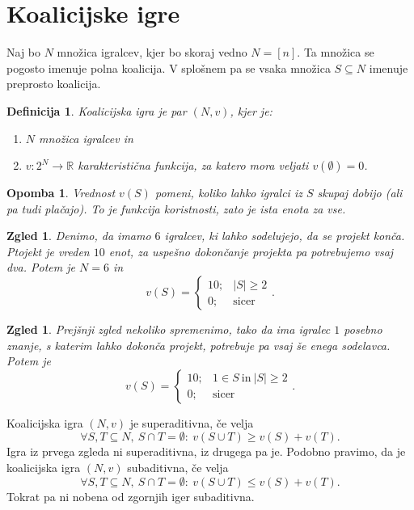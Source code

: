 \documentclass[10pt, a4paper]{article}
\newtheorem{defi}[izr]{Definicija}
\newenvironment{noticeB}{%
  \tcolorbox[%
  notitle,
  empty,
  enhanced,  %
  breakable,
  coltext=black,
  colback=white, 
  fontupper=\rmfamily,
  noparskip,
  sharp corners,
  boxrule=-1pt,  %
  frame hidden,
  left=7pt,  %
  right=7pt,
  top=5pt,
  bottom=5pt,
  before skip=2.5ex plus 2pt,
  after skip=2.5ex plus 2pt,
  borderline west = {1.5pt}{-0.1pt}{blue!30!black}, %
  overlay unbroken and last={%
    \draw[color=black, line width=1.25pt]
    ($(frame.south west)+(1.pt, -0.1pt)$) -- ++(2em, 0);
  }
  ]}
{\endtcolorbox}
\newenvironment{definicija}{\begin{noticeB}\begin{defi}}{%
    \end{defi}\end{noticeB}}
\newtheorem*{opomba}{Opomba}
\newtheorem{zgled}[izr]{Zgled}
\newcommand{\R}{\mathbb {R}}
\begin{document}
\section{Koalicijske igre}

Naj bo $N$ množica igralcev, kjer bo skoraj vedno $N = [n]$.
Ta množica se pogosto imenuje polna koalicija. V splošnem pa se vsaka množica $S \subseteq N$
imenuje preprosto koalicija.

\begin{definicija}
  Koalicijska igra je par $(N, v)$, kjer je:
  \begin{enumerate}
    \item $N$ množica igralcev in
    \item $v: 2^N \to \R$ karakteristična funkcija, za katero mora veljati $v(\emptyset) = 0$.
  \end{enumerate}
\end{definicija}

\begin{opomba}
  Vrednost $v(S)$ pomeni, koliko lahko igralci iz $S$ skupaj dobijo (ali pa tudi plačajo).
  To je funkcija koristnosti, zato je ista enota za vse.
\end{opomba}

\begin{zgled}
  Denimo, da imamo $6$ igralcev, ki lahko sodelujejo, da se projekt konča.
  Ptojekt je vreden $10$ enot, za uspešno dokončanje projekta pa potrebujemo vsaj dva.
  Potem je $N = 6$ in 
  $$v(S) = \begin{cases}
    10;& |S| \geq 2\\
    0;& \text{sicer}
  \end{cases}.$$
\end{zgled}

\begin{zgled}
  Prejšnji zgled nekoliko spremenimo, tako da ima igralec $1$ posebno znanje, s katerim lahko dokonča projekt,
  potrebuje pa vsaj še enega sodelavca. Potem je 
  $$v(S) = \begin{cases}
    10;& 1 \in S\ \text{in}\ |S| \geq 2\\
    0;& \text{sicer}
  \end{cases}.$$
\end{zgled}

Koalicijska igra $(N, v)$ je superaditivna, če velja 
$$\forall S, T \subseteq N,\ S \cap T = \emptyset:\ v(S \cup T) \geq v(S) + v(T).$$
Igra iz prvega zgleda ni superaditivna, iz drugega pa je.
Podobno pravimo, da je koalicijska igra $(N, v)$ subaditivna, če velja 
$$\forall S, T \subseteq N,\ S \cap T = \emptyset:\ v(S \cup T) \leq v(S) + v(T).$$
Tokrat pa ni nobena od zgornjih iger subaditivna.
\end{document}
